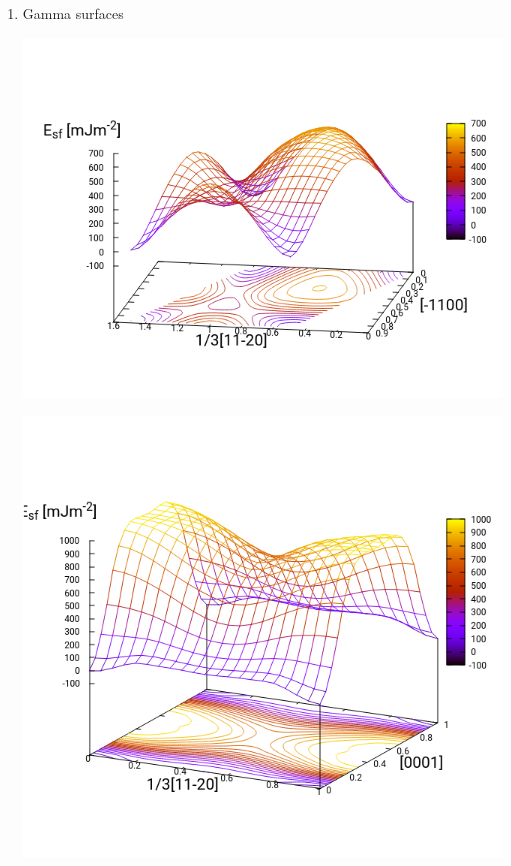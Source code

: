 \documentclass[11pt]{article}
\begin{document}
\begin{enumerate}
\item Gamma surfaces
\label{sec:org3f441f6}
\begin{center}
\includegraphics[width=.9\linewidth]{Images/basal_gs_noo_2019-11-08_alat.png}
\end{center}
\begin{center}
\includegraphics[width=.9\linewidth]{Images/prismatic_gs_noo_2019-11-08_alat.png}
\end{center}
\begin{center}

\end{center}
\end{enumerate}
\end{document}
